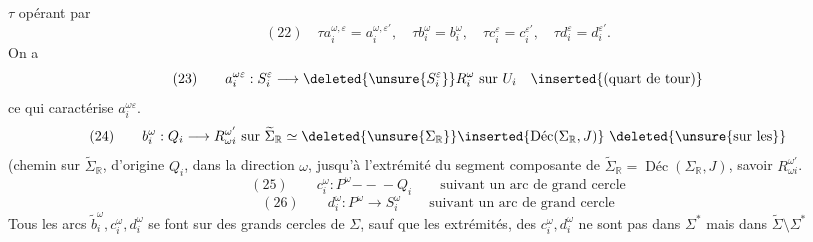 $\tau$ opérant par
\[
(22)\quad \tau a_i^{\omega,\varepsilon}=a_i^{\omega,\varepsilon'},\quad
\tau b_i^\omega=b_i^\omega,\quad \tau c_i^\varepsilon=c_i^{\varepsilon'},\quad \tau d_i^\varepsilon=d_i^{\varepsilon'}.
\]
On a
\[
(23)\qquad a_i^{\omega\varepsilon}:S_i^\varepsilon\longrightarrow\deleted{\unsure{S_i^\varepsilon}}R_i^\omega\text{ sur }U_i\quad\inserted{(\text{quart de tour})}
\]
ce qui caractérise $a_i^{\omega\varepsilon}$. 
\[
(24)\qquad b_i^\omega:Q_i\longrightarrow R_{\omega i}^{\omega'}\text{ sur }\widetilde\Sigma_{\mathbb R}\simeq\deleted{\unsure{\Sigma_{\mathbb R}}}\inserted{\operatorname{\text{Déc}}(\Sigma_{\mathbb R},J)}\ \deleted{\unsure{\text{sur les}}}
\]
(chemin sur $\widetilde\Sigma_{\mathbb R}$, d'origine $Q_i$, dans la direction $\omega$, jusqu'à l'extrémité  du segment composante de $\widetilde\Sigma_{\mathbb R}=\operatorname{\text{Déc}}(\Sigma_{\mathbb R},J)$, savoir $R_{\omega i}^{\omega'}$.
\[
(25)\qquad c_i^\omega:P^\omega\mathrel{-\!\!\!-\!\!\!-}Q_i\qquad\text{suivant un arc de grand cercle}
\]
\[
(26)\qquad d_i^\omega:P^\omega\longrightarrow S_i^\omega\qquad\text{suivant un arc de grand cercle}
\]
Tous les arcs $\widetilde b_i^\omega,c_i^\omega,d_i^\omega$ se font sur des grands cercles de $\Sigma$, sauf que les extrémités, des $c_i^\omega,d_i^\omega$ ne sont pas dans $\Sigma^*$ mais dans  $\widetilde\Sigma\setminus\Sigma^*$

